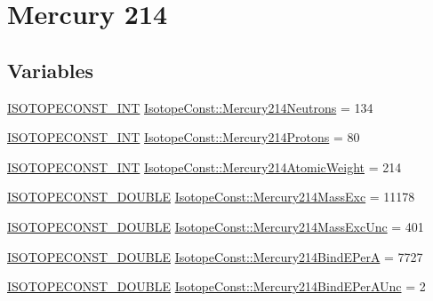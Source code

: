 \hypertarget{group___isotope_const-_mercury-_hg214}{}\section{Mercury 214}
\label{group___isotope_const-_mercury-_hg214}
\subsection*{Variables}
\begin{DoxyCompactItemize}
\item 
\mbox{\hyperlink{group___isotope_const-_macros_ga5f18360b3e99483a35c32d789e62621c}{I\+S\+O\+T\+O\+P\+E\+C\+O\+N\+S\+T\+\_\+\+I\+NT}} \mbox{\hyperlink{group___isotope_const-_mercury-_hg214_ga6754786766d0471769138d817c2ec27f}{Isotope\+Const\+::\+Mercury214\+Neutrons}} = 134
\item 
\mbox{\hyperlink{group___isotope_const-_macros_ga5f18360b3e99483a35c32d789e62621c}{I\+S\+O\+T\+O\+P\+E\+C\+O\+N\+S\+T\+\_\+\+I\+NT}} \mbox{\hyperlink{group___isotope_const-_mercury-_hg214_ga1194fad6eb8f075364688c3b026dd50a}{Isotope\+Const\+::\+Mercury214\+Protons}} = 80
\item 
\mbox{\hyperlink{group___isotope_const-_macros_ga5f18360b3e99483a35c32d789e62621c}{I\+S\+O\+T\+O\+P\+E\+C\+O\+N\+S\+T\+\_\+\+I\+NT}} \mbox{\hyperlink{group___isotope_const-_mercury-_hg214_ga8c1e5f73ba95e8631f1e73545f19e783}{Isotope\+Const\+::\+Mercury214\+Atomic\+Weight}} = 214
\item 
\mbox{\hyperlink{group___isotope_const-_macros_ga8f45a7272ce02c0b4c65c44636ed719a}{I\+S\+O\+T\+O\+P\+E\+C\+O\+N\+S\+T\+\_\+\+D\+O\+U\+B\+LE}} \mbox{\hyperlink{group___isotope_const-_mercury-_hg214_gabc4bef0a49c112c19f504a05135261e4}{Isotope\+Const\+::\+Mercury214\+Mass\+Exc}} = 11178
\item 
\mbox{\hyperlink{group___isotope_const-_macros_ga8f45a7272ce02c0b4c65c44636ed719a}{I\+S\+O\+T\+O\+P\+E\+C\+O\+N\+S\+T\+\_\+\+D\+O\+U\+B\+LE}} \mbox{\hyperlink{group___isotope_const-_mercury-_hg214_gaeb1b1445cb0b7e156b4c2ebd2eca0498}{Isotope\+Const\+::\+Mercury214\+Mass\+Exc\+Unc}} = 401
\item 
\mbox{\hyperlink{group___isotope_const-_macros_ga8f45a7272ce02c0b4c65c44636ed719a}{I\+S\+O\+T\+O\+P\+E\+C\+O\+N\+S\+T\+\_\+\+D\+O\+U\+B\+LE}} \mbox{\hyperlink{group___isotope_const-_mercury-_hg214_ga0837b15104443e59b51d6c96306cc0d2}{Isotope\+Const\+::\+Mercury214\+Bind\+E\+PerA}} = 7727
\item 
\mbox{\hyperlink{group___isotope_const-_macros_ga8f45a7272ce02c0b4c65c44636ed719a}{I\+S\+O\+T\+O\+P\+E\+C\+O\+N\+S\+T\+\_\+\+D\+O\+U\+B\+LE}} \mbox{\hyperlink{group___isotope_const-_mercury-_hg214_gac7436e688a71af8a2b5466f5ca8d65ca}{Isotope\+Const\+::\+Mercury214\+Bind\+E\+Per\+A\+Unc}} = 2

\end{DoxyCompactItemize}
